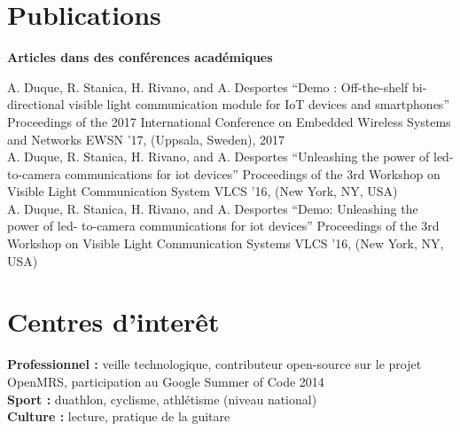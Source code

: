 \documentclass[]{cv-style}          %
\begin{document}
\section{Publications}
 \vspace{-0.2cm}
\large{\textbf{Articles dans des conférences académiques}} \\
\normalsize
\begin{publist}
\pub
{A. Duque, R. Stanica, H. Rivano, and A. Desportes}
{“Demo : Off-the-shelf bi-directional visible light communication module for IoT devices and smartphones”}
{Proceedings of the 2017 International Conference on Embedded Wireless Systems and Networks}
{EWSN ’17, (Uppsala, Sweden), 2017}\\
\pub
  {A. Duque, R. Stanica, H. Rivano, and A. Desportes}
  {“Unleashing the power of led- to-camera communications for iot devices”}
  {Proceedings of the 3rd Workshop on Visible Light Communication System}
  {VLCS ’16, (New York, NY, USA)}\\
\pub
  {A. Duque, R. Stanica, H. Rivano, and A. Desportes} {“Demo: Unleashing the power of led- to-camera communications for iot devices”} {Proceedings of the 3rd Workshop on Visible Light Communication Systems} {VLCS ’16, (New York, NY, USA)}

\end{publist}


\section{Centres d'interêt}
  \vspace{-0.2cm}
  
\textbf{Professionnel :} veille technologique,  contributeur open-source sur le projet OpenMRS, participation au Google Summer of Code 2014 \\
\textbf{Sport :} duathlon, cyclisme, athlétisme (niveau national) \\
\textbf{Culture :} lecture, pratique de la guitare
\end{document}
